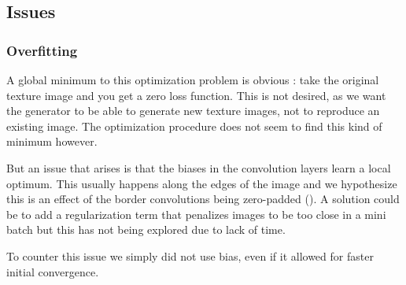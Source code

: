 \documentclass{article}
\begin{document}
\subsection{Issues}
\subsubsection{Overfitting}

A global minimum to this optimization problem is obvious : take the original texture image and you get a zero loss function. This is not desired, as we want the generator to be able to generate new texture images, not to reproduce an existing image. The optimization procedure does not seem to find this kind of minimum however.

But an issue that arises is that the biases in the convolution layers learn a local optimum. This usually happens along the edges of the image and we hypothesize this is an effect of the border convolutions being zero-padded (\label{fig:overfit}). A solution could be to add a regularization term that penalizes images to be too close in a mini batch but this has not being explored due to lack of time.

To counter this issue we simply did not use bias, even if it allowed for faster initial convergence.
\end{document}
